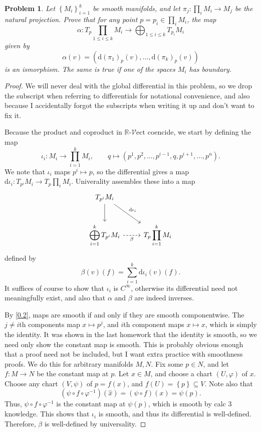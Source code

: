 \documentclass[11pt, letterpaper]{article}
\theoremstyle{plain}
\newtheorem{problem}{Problem}
\begin{document}
\begin{problem}\label{2}
	Let $\left\{ M_i \right\}_{i=1}^k$ be smooth manifolds, and let $\pi _j : \prod_{i} M_i \to M_j$ be the natural projection. Prove that for any point $p=p_i \in \prod_{i} M_i$, the map
	\[
		\alpha : T_p \prod_{1\leq i\leq k} M_i \to \bigoplus_{1\leq i\leq k} T_{p_i} M_i
	\]
	given by
	\[
		\alpha (v)=\left( \mathrm{d} (\pi _1)_p(v), \ldots ,\mathrm{d} (\pi _k)_p(v) \right) 
	\]
	is an ismorphism. The same is true if one of the spaces $M_i$ has boundary.
\end{problem}
\begin{proof}
	We will never deal with the global differential in this problem, so we drop the subscript when referring to differentials for notational convenience, and also because I accidentally forgot the subscripts when writing it up and don't want to fix it.

	Because the product and coproduct in $\mathbb{R} $-$\mathcal{V} \mathrm{ect} $ coencide, we start by defining the map
	\[
		\iota _i : M_i \to \prod_{i=1}^{k} M_i,\qquad q \mapsto (p^1,p^2, \ldots ,p ^{i-1} ,q,p ^{i+1} , \ldots ,p^n)
	.\]
	We note that $\iota _i$ maps $p^i\mapsto p$, so the differential gives a map $\mathrm{d} \iota _i : T_{p^i} M_i \to T_p \prod_{i} M_i$. Univerality assembles these into a map
	\[\begin{tikzcd}[row sep = 2.5em, column sep = 2.5em]
	T_{p^i} M_i \ar[" \mathrm{d}\iota _i ", dr] \ar[d]  &  \\
	\displaystyle{\bigoplus_{i=1}^k T_{p^i} M_i}\ar[" \beta  "', dashed, r]  & \displaystyle{T_p \prod_{i=1}^{k} M_i}
	\end{tikzcd}\]
	defined by
	\[
		\beta (v)(f)=\sum_{i=1}^{k} \mathrm{d} \iota_i(v)(f)
	.\]
	It suffices of course to show that $\iota _i$ is $C^\infty $, otherwise its differential need not meaningfully exist, and also that $\alpha $ and $\beta $ are indeed inverses. 

	By \cref{0.2}, maps are smooth if and only if they are smooth componentwise. The $j\neq i$th components map $x\mapsto p^j$, and $i$th component maps $x\mapsto x$, which is simply the identity. It was shown in the last homework that the identity is smooth, so we need only show the constant map is smooth. This is probably obvious enough that a proof need not be included, but I want extra practice with smoothness proofs. We do this for arbitrary manifolds $M,N$. Fix some $p\in N$, and let $f : M \to N$ be the constant map at $p$. Let $x\in M$, and choose a chart $(U,\varphi )$ of $x$. Choose any chart $(V,\psi )$ of $p=f(x)$, and $f(U)=\left\{ p \right\} \subseteq V$. Note also that
	\[
		(\psi \circ f\circ \varphi ^{-1} )(\hat{x} )=(\psi \circ f)(x)=\psi (p)
	.\]
	Thus, $\psi \circ f\circ \varphi ^{-1} $ is the constant map at $\psi (p)$, which is smooth by calc 3 knowledge. This shows that $\iota _i$ is smooth, and thus its differential is well-defined. Therefore, $\beta $ is well-defined by universality.


\end{proof}
\end{document}
